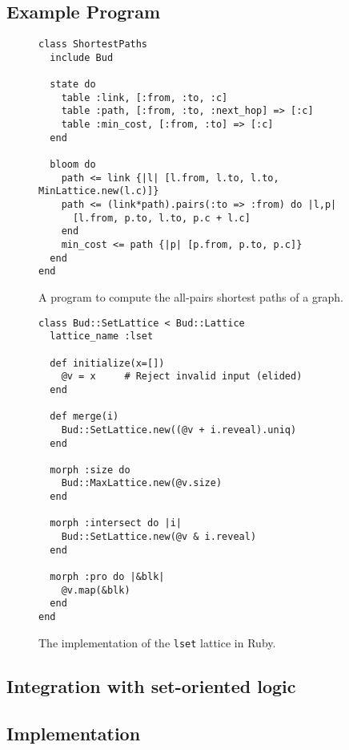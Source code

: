 \subsection{Example Program}
\begin{figure}[t]
\begin{scriptsize}
\begin{lstlisting}
class ShortestPaths
  include Bud

  state do
    table :link, [:from, :to, :c]
    table :path, [:from, :to, :next_hop] => [:c]
    table :min_cost, [:from, :to] => [:c]
  end

  bloom do
    path <= link {|l| [l.from, l.to, l.to, MinLattice.new(l.c)]}
    path <= (link*path).pairs(:to => :from) do |l,p|
      [l.from, p.to, l.to, p.c + l.c]
    end
    min_cost <= path {|p| [p.from, p.to, p.c]}
  end
end
\end{lstlisting}
\end{scriptsize}
\caption{A \lang program to compute the all-pairs shortest paths of a
  graph.}
\label{fig:lattice-spaths}
\end{figure}

\begin{figure}[t]
\begin{scriptsize}
\begin{lstlisting}
class Bud::SetLattice < Bud::Lattice
  lattice_name :lset

  def initialize(x=[])
    @v = x     # Reject invalid input (elided)
  end

  def merge(i)
    Bud::SetLattice.new((@v + i.reveal).uniq)
  end

  morph :size do
    Bud::MaxLattice.new(@v.size)
  end

  morph :intersect do |i|
    Bud::SetLattice.new(@v & i.reveal)
  end

  morph :pro do |&blk|
    @v.map(&blk)
  end
end
\end{lstlisting}
\end{scriptsize}
\caption{The implementation of the \texttt{lset} lattice in Ruby.}
\label{fig:lattice-set}
\end{figure}

\subsection{Integration with set-oriented logic}

\subsection{Implementation}

